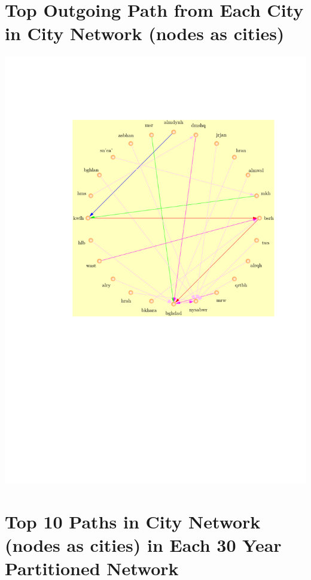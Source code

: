 \documentclass[12pt,english]{article}
\begin{document}
\section{Top Outgoing Path from Each City in City Network (nodes as cities)}
\vspace*{-3cm}
\hspace*{-4cm}
\includegraphics[scale=1]{top-paths/Hadith_Movement_Dragon_Diagram_Top_Path_Out_of_Each_City.pdf}


\newpage
\section{Top 10 Paths in City Network (nodes as cities) in Each 30 Year Partitioned Network}
\end{document}
